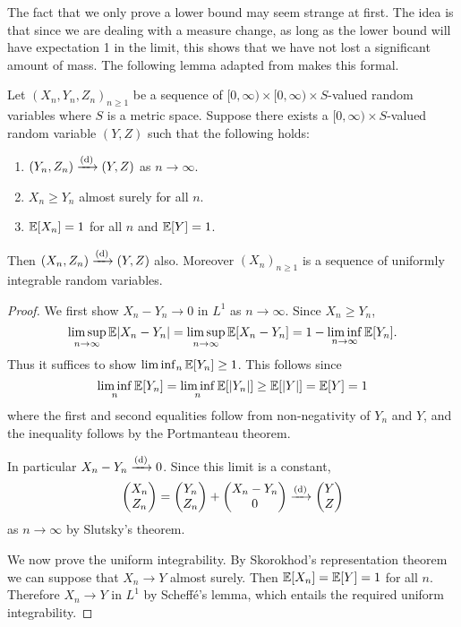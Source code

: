 The fact that we only prove a lower bound may seem strange at first. The idea is that since we are dealing with a measure change, as long as the lower bound will have expectation 1 in the limit, this shows that we have not lost a significant amount of mass. The following lemma adapted from \cite[Lemma 4.8]{conchon--kerjanStableGraphMetric2020} makes this formal.
\begin{lemma}
    \label{lem:sandwiching-lemma}
    Let $(X_n, Y_n, Z_n)_{n \geq 1}$ be a sequence of $[0, \infty) \times [0, \infty) \times S$-valued random variables where $S$ is a metric space. Suppose there exists a $[0, \infty) \times S$-valued random variable $(Y, Z)$ such that the following holds:
    \begin{enumerate}
        \item $(Y_n, Z_n) \xrightarrow[]{\mathrm{(d)}} (Y, Z)$ as $n \to \infty$.
        \item $X_n \geq Y_n$ almost surely for all $n$.
        \item ${\mathbb E}[X_n] = 1$ for all $n$ and ${\mathbb E}[Y] = 1$.
    \end{enumerate}
    Then $(X_n, Z_n) \xrightarrow[]{\mathrm{(d)}} (Y, Z)$ also. Moreover $(X_n)_{n \geq 1}$ is a sequence of uniformly integrable random variables.
\end{lemma}
\begin{proof}
    We first show $X_n - Y_n \to 0$ in $L^1$ as $n \to \infty$. Since $X_n \geq Y_n$,
    \begin{equation*}
        \limsup_{n \to \infty} {\mathbb E} \lvert X_n - Y_n\rvert
        = \limsup_{n \to \infty} {\mathbb E}[X_n - Y_n]
        = 1 - \liminf_{n \to \infty} {\mathbb E}[Y_n].
    \end{equation*}
    Thus it suffices to show $\liminf_n {\mathbb E}[Y_n] \geq 1$. This follows since
    \begin{equation*}
        \liminf_n {\mathbb E}[Y_n] =
        \liminf_n {\mathbb E}[\lvert Y_n\rvert] \geq
        {\mathbb E}[\lvert Y\rvert] =
        {\mathbb E}[Y] = 1
    \end{equation*}
    where the first and second equalities follow from non-negativity of $Y_n$ and $Y$, and the inequality follows by the Portmanteau theorem.

    In particular $X_n - Y_n \xrightarrow[]{\mathrm{(d)}} 0$. Since this limit is a constant,
    \begin{equation*}
        \begin{pmatrix} X_n \\ Z_n \end{pmatrix} = \begin{pmatrix} Y_n \\ Z_n \end{pmatrix} + \begin{pmatrix} X_n - Y_n \\ 0 \end{pmatrix} \xrightarrow[]{\mathrm{(d)}} \begin{pmatrix} Y \\ Z \end{pmatrix}
    \end{equation*}
    as $n \to \infty$ by Slutsky's theorem.

    We now prove the uniform integrability. By Skorokhod's representation theorem we can suppose that $X_n \to Y$ almost surely. Then ${\mathbb E}[X_n] = {\mathbb E}[Y] = 1$ for all $n$. Therefore $X_n \to Y$ in $L^1$ by Scheffé's lemma, which entails the required uniform integrability.
\end{proof}


